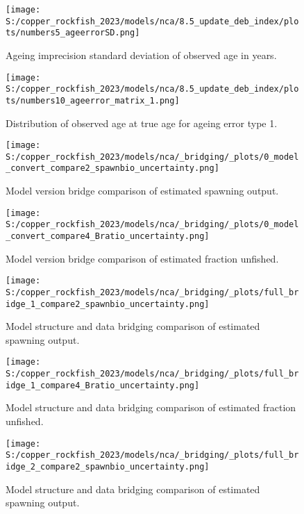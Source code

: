 \documentclass[11pt,
  english,
  letterpaper,
]{article}
\begin{document}
\begin{figure}
\centering
\texttt{[image: S:/copper\_rockfish\_2023/models/nca/8.5\_update\_deb\_index/plots/numbers5\_ageerrorSD.png]}
\caption{Ageing imprecision standard deviation of observed age in years.\label{fig:age-error}}
\end{figure}

\begin{figure}
\centering
\texttt{[image: S:/copper\_rockfish\_2023/models/nca/8.5\_update\_deb\_index/plots/numbers10\_ageerror\_matrix\_1.png]}
\caption{Distribution of observed age at true age for ageing error type 1.\label{fig:age-error-matrix}}
\end{figure}

\begin{figure}
\centering
\texttt{[image: S:/copper\_rockfish\_2023/models/nca/\_bridging/\_plots/0\_model\_convert\_compare2\_spawnbio\_uncertainty.png]}
\caption{Model version bridge comparison of estimated spawning output.\label{fig:bridge-ssb}}
\end{figure}

\begin{figure}
\centering
\texttt{[image: S:/copper\_rockfish\_2023/models/nca/\_bridging/\_plots/0\_model\_convert\_compare4\_Bratio\_uncertainty.png]}
\caption{Model version bridge comparison of estimated fraction unfished.\label{fig:bridge-depl}}
\end{figure}

\begin{figure}
\centering
\texttt{[image: S:/copper\_rockfish\_2023/models/nca/\_bridging/\_plots/full\_bridge\_1\_compare2\_spawnbio\_uncertainty.png]}
\caption{Model structure and data bridging comparison of estimated spawning output.\label{fig:data-bridge-ssb-1}}
\end{figure}

\begin{figure}
\centering
\texttt{[image: S:/copper\_rockfish\_2023/models/nca/\_bridging/\_plots/full\_bridge\_1\_compare4\_Bratio\_uncertainty.png]}
\caption{Model structure and data bridging comparison of estimated fraction unfished.\label{fig:data-bridge-depl-1}}
\end{figure}

\begin{figure}
\centering
\texttt{[image: S:/copper\_rockfish\_2023/models/nca/\_bridging/\_plots/full\_bridge\_2\_compare2\_spawnbio\_uncertainty.png]}
\caption{Model structure and data bridging comparison of estimated spawning output.\label{fig:data-bridge-ssb-2}}
\end{figure}
\end{document}
